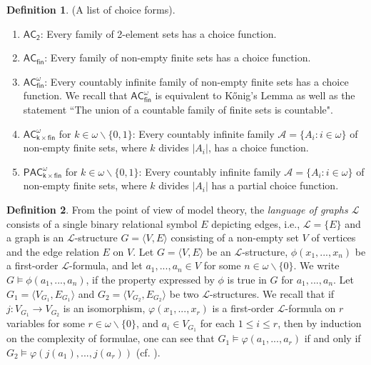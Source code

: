 \documentclass[12pt,reqno,a4paper]{amsart}
\theoremstyle{definition}
\newtheorem{defn}{Definition}[section]
\begin{document}
	\begin{defn}{(A list of choice forms).}
		
		\begin{enumerate}
			\item $\mathsf{AC_{2}}$: Every family of 2-element sets has a choice function.
			\item $\mathsf{AC_{fin}}$: Every family of non-empty finite sets has a choice function. 
			
			\item $\mathsf{AC_{fin}^{\omega}}$: Every countably infinite family of non-empty finite sets has a choice function. We recall that $\mathsf{AC_{fin}^{\omega}}$ is equivalent to
			K\H{o}nig’s Lemma as well as the statement ``The union of a countable
			family of finite sets is countable".
			\item $\mathsf{AC^{\omega}_{\text{$k$}\times fin}}$ for $k\in \omega\backslash\{0,1\}$: Every countably infinite family $\mathcal{A}=\{A_{i}:i\in\omega\}$ of non-empty finite sets, where $k$ divides $\vert A_{i} \vert$, has a choice function.
			
			\item $\mathsf{PAC^{\omega}_{\text{$k$}\times fin}}$ for $k\in \omega\backslash\{0,1\}$: Every countably infinite family $\mathcal{A}=\{A_{i}:i\in\omega\}$ of non-empty finite sets, where $k$ divides $\vert A_{i} \vert$ has a partial choice function. 
			
		\end{enumerate}
	\end{defn}
	\begin{defn}
		From the point of view of model theory, the {\em language of graphs $\mathcal{L}$} consists of a single binary relational symbol $E$ depicting edges, i.e., $\mathcal{L}=\{E\}$ and a graph is an $\mathcal{L}$-structure $G=\langle V, E\rangle$ consisting of a non-empty set $V$ of vertices and the edge relation $E$ on $V$. 
		Let $G=\langle V, E\rangle$ be an $\mathcal{L}$-structure, $\phi(x_{1},..., x_{n})$ be a first-order $\mathcal{L}$-formula, and let $a_1,...,a_n \in V$ for some $n\in\omega\backslash\{0\}$.
		We write
		$G \models \phi(a_1,...,a_n)$,
		if the property expressed by $\phi$ is true in $G$ for $a_1,...,a_n$.
		Let $G_{1}=\langle V_{G_{1}}, E_{G_{1}}\rangle$ and $G_{2}=\langle V_{G_{2}}, E_{G_{2}}\rangle$ be two $\mathcal{L}$-structures. We recall that if $j: V_{G_{1}}\to V_{G_{2}}$ is an isomorphism, $\varphi(x_{1},..., x_{r})$ is a first-order $\mathcal{L}$-formula on $r$ variables for some $r\in\omega\backslash\{0\}$, and $a_{i}\in V_{G_{1}}$ for each $1\leq i\leq r$, then by induction on the complexity of formulae, one can see that $G_{1}\models\varphi(a_{1},..., a_{r})$ if and only if $G_{2}\models\varphi(j(a_{1}),..., j(a_{r}))$ (cf. \cite[Theorem 1.1.10]{Mar2002}). 
	\end{defn}
	
\end{document}
